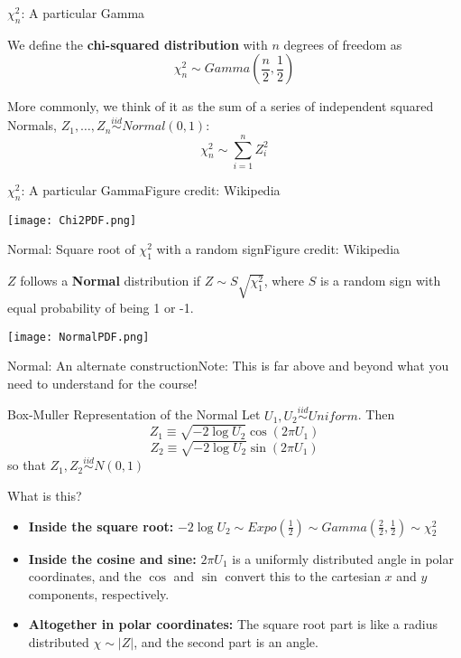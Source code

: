 \documentclass{beamer}
\begin{document}
\begin{frame}{$\chi^2_n$: A particular Gamma}
\begin{definition}
We define the \textbf{chi-squared distribution} with $n$ degrees of freedom as
$$\chi^2_n\sim Gamma\left(\frac{n}{2},\frac{1}{2}\right)$$
\end{definition}
More commonly, we think of it as the sum of a series of independent squared Normals, $Z_1,\dots,Z_n\stackrel{iid}{\sim}Normal(0,1)$:
$$\chi^2_n\sim \sum_{i=1}^n Z_i^2$$
\end{frame}

\begin{frame}{$\chi^2_n$: A particular Gamma}{Figure credit: Wikipedia}
\begin{center}\texttt{[image: Chi2PDF.png]}\end{center}
\end{frame}

\begin{frame}{Normal: Square root of $\chi^2_1$ with a random sign}{Figure credit: Wikipedia}
\begin{definition}
$Z$ follows a \textbf{Normal} distribution if $Z\sim S\sqrt{\chi^2_1}$, where $S$ is a random sign with equal probability of being 1 or -1.
\end{definition}
\begin{center}\texttt{[image: NormalPDF.png]}\end{center}
\end{frame}


\begin{frame}{Normal: An alternate construction}{Note: This is far above and beyond what you need to understand for the course!}
\begin{block}{Box-Muller Representation of the Normal}
Let $U_1,U_2\stackrel{iid}{\sim}Uniform$. Then
$$Z_1\equiv \sqrt{-2 \log U_2}\cos(2\pi U_1)$$
$$Z_2\equiv \sqrt{-2 \log U_2}\sin(2\pi U_1)$$
so that $Z_1,Z_2\stackrel{iid}{\sim} N(0,1)$
\end{block}
\begin{footnotesize}
What is this?
\begin{itemize}
\item \textbf{Inside the square root:} $-2\log U_2\sim Expo\left(\frac{1}{2}\right)\sim Gamma\left(\frac{2}{2},\frac{1}{2}\right)\sim \chi^2_2$
\item \textbf{Inside the cosine and sine:} $2\pi U_1$ is a uniformly distributed angle in polar coordinates, and the $\cos$ and $\sin$ convert this to the cartesian $x$ and $y$ components, respectively.
\item \textbf{Altogether in polar coordinates:} The square root part is like a radius distributed $\chi\sim |Z|$, and the second part is an angle.
\end{itemize}
\end{footnotesize}
\end{frame}
\end{document}
